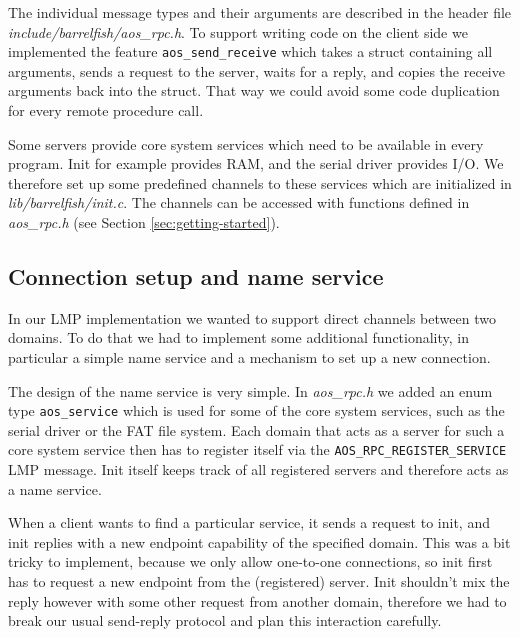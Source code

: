 \documentclass[a4paper,10pt]{article}
\newcommand{\filepath}[1]{\emph{ #1}}
\begin{document}
The individual message types and their arguments are described in the header file \filepath{include/barrelfish/aos\_rpc.h}.
To support writing code on the client side we implemented the feature \lstinline!aos_send_receive! which takes a struct containing all arguments, 
sends a request to the server, waits for a reply, and copies the receive arguments back into the struct.
That way we could avoid some code duplication for every remote procedure call.

Some servers provide core system services which need to be available in every program.
Init for example provides RAM, and the serial driver provides I/O.
We therefore set up some predefined channels to these services which are initialized in \filepath{lib/barrelfish/init.c}.
The channels can be accessed with functions defined in \filepath{aos\_rpc.h} (see Section \ref{sec:getting-started}).

\subsection{Connection setup and name service}

In our LMP implementation we wanted to support direct channels between two domains.
To do that we had to implement some additional functionality, in particular a simple name service and a mechanism to set up a new connection.

The design of the name service is very simple.
In \filepath{aos\_rpc.h} we added an enum type \lstinline!aos_service! which is used for some of the core system services, such as the serial driver or the FAT file system.
Each domain that acts as a server for such a core system service then has to register itself via the \lstinline!AOS_RPC_REGISTER_SERVICE! LMP message.
Init itself keeps track of all registered servers and therefore acts as a name service.

When a client wants to find a particular service, it sends a request to init, and init replies with a new endpoint capability of the specified domain.
This was a bit tricky to implement, because we only allow one-to-one connections, so init first has to request a new endpoint from the (registered) server.
Init shouldn't mix the reply however with some other request from another domain, therefore we had to break our usual send-reply protocol and plan this interaction carefully.
\end{document}
